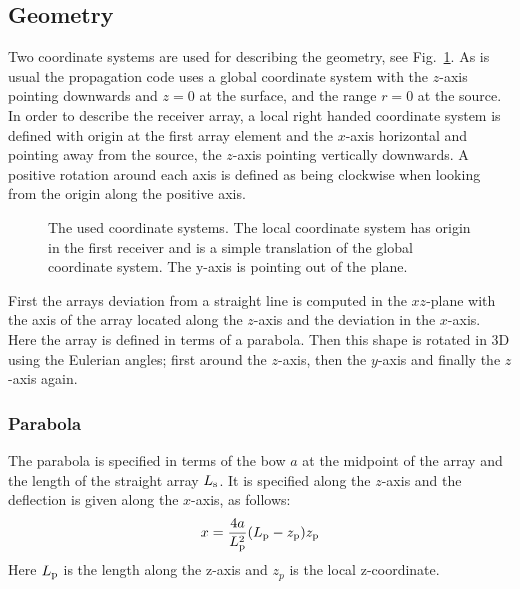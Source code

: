 \documentclass{saclantc}
\begin{document}
\subsection{Geometry}
Two coordinate systems are used for describing the geometry, see Fig.\
\ref{covertcoord}. As is
usual the propagation code uses a global coordinate system with the $z$-axis
pointing downwards and $z=0$ at the surface, and the range $r=0$ at the
source.
%
In order to describe the receiver array,
a local right handed coordinate system is defined with origin at the first
array element and the $x$-axis horizontal and pointing away from the source,
the  $z$-axis pointing vertically downwards.
%
A positive rotation around each axis is defined as being
clockwise when looking from  the origin along the positive axis.
   \begin{figure}
      \epsfxsize=10cm \centerline{}
      \caption{The used coordinate systems. The local coordinate
system has origin in the first receiver and is a simple translation of
the global coordinate system. The y-axis is pointing out of the plane.}  
\label{covertcoord}  
\end{figure}

First the arrays deviation from a straight line is computed 
in the $xz$-plane with the axis of the array located along the
$z$-axis and the deviation in the $x$-axis. 
Here the array is defined in terms of a parabola.
Then this shape is rotated in 3D using the Eulerian angles\cite{marrion}; 
first around the $z$-axis, then
the $y$-axis and finally the $z$-axis again.

 

\subsubsection{Parabola}

The parabola is specified in terms of the bow  $a$ at the midpoint of the array and the length of the straight
array $L_{\rm s}$.
It is specified along the $z$-axis and the deflection is given along the
$x$-axis, as follows:
\begin{equation}
x= \frac{4 a}{L_{\rm p}^2}(L_{\rm p}-z_{\rm p})z_{\rm p}
\label{eq:parab}
\end{equation}
Here $L_{\rm p}$ is the length along the z-axis and $z_p$ is the local
z-coordinate.
\end{document}
